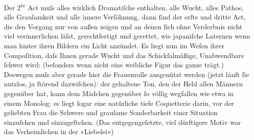 \pstart
           {\pb}Der 2\textsuperscript{te}{ }Act muſs alles wirklich
               Dramatiſche enthalten, alle Wucht, alles Pathos, alle Grauſamkeit und alle innere Verſöhnung, dann{ }ſind der erſte und dritte
               Act, die den Vorgang nur von außen zeigen und an denen{ }ſich ohne Verderbnis nicht
               viel verinnerlichen läſst, gerechtfertigt und gerettet, wie japaniſche Laternen wenn man hinter ihren Bildern ein Licht
               anzündet. Es liegt {\pb}nun im Weſen
               ihrer Compoſition, daſs Ihnen gerade Wucht und das Schickſalmäßige, Unabwendbare{ }ſchwer wird: (beſonders wenn nicht eine weibliche Figur das ganze trägt.) Deswegen
               muſs aber gerade hier die Frauenrolle ausgenützt werden (jetzt läuft{ }ſie nutzlos, ja{ }ſtörend dazwiſchen): der gehaltene Ton, den der Held allen Männern gegenüber hat,
               kann dem Mädchen gegenüber{ }ſo völlig wegfallen wie etwa in einem Monolog: es liegt{ }ſogar eine natürliche tiefe Coquetterie darin, {\pb}vor der geliebten Frau die Schwere
               und grauſame Sonderbarkeit einer Situation einzuſehen und einzugeſtehen. (Das
               entgegengeſetzte, viel dürftigere Motiv war das Verheimlichen in der »Liebelei«)\pend
           
